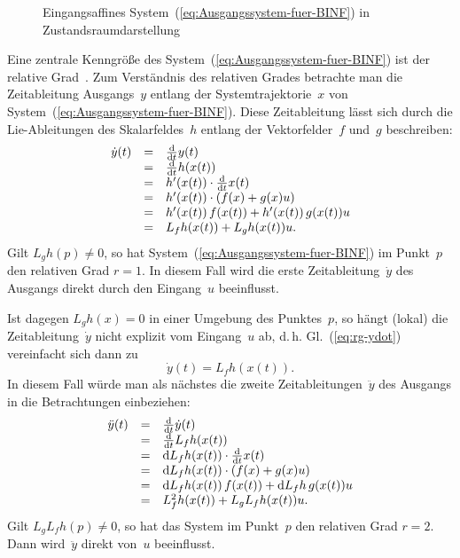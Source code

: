 \begin{figure}
\begin{centering}
\resizebox{0.8\textwidth}{!}{}
\par\end{centering}
\caption{Eingangsaffines System~(\ref{eq:Ausgangssystem-fuer-BINF}) in Zustandsraumdarstellung\label{fig:Ausgangssystem-fuer-BINF}}
\end{figure}

Eine zentrale Kenngröße des System~(\ref{eq:Ausgangssystem-fuer-BINF})
ist der relative Grad~\cite{isidori3,nijmeijer90}. Zum Verständnis
des relativen Grades betrachte man die Zeitableitung Ausgangs~$y$
entlang der Systemtrajektorie~$x$ von System~(\ref{eq:Ausgangssystem-fuer-BINF}).
Diese Zeitableitung lässt sich durch die Lie-Ableitungen des Skalarfeldes~$h$
entlang der Vektorfelder~$f$ und~$g$ beschreiben: 
\begin{equation}
\begin{array}{ccl}
\dot{y}(t) & = & \tfrac{{\mathrm{d}}}{{\mathrm{d}} t}y(t)\\
 & = & \tfrac{{\mathrm{d}}}{{\mathrm{d}} t}h(x(t))\\
 & = & h^{\prime}(x(t))\cdot\tfrac{{\mathrm{d}}}{{\mathrm{d}} t}x(t)\\
 & = & h^{\prime}(x(t))\cdot(f(x)+g(x)u)\\
 & = & h^{\prime}(x(t))\,f(x(t))+h^{\prime}(x(t))\,g(x(t))u\\
 & = & L_{f}h(x(t))+L_{g}h(x(t))u.
\end{array}\label{eq:rg-ydot}
\end{equation}
Gilt $L_{g}h(p)\neq0$, so hat System~(\ref{eq:Ausgangssystem-fuer-BINF})
im Punkt~$p$ den relativen Grad $r=1$. In diesem Fall wird die
erste Zeitableitung~$\dot{y}$ des Ausgangs direkt durch den Eingang~$u$
beeinflusst. 

Ist dagegen $L_{g}h(x)=0$ in einer Umgebung des Punktes~$p$, so
hängt (lokal) die Zeitableitung~$\dot{y}$ nicht explizit vom Eingang~$u$
ab, d.\,h. Gl.~(\ref{eq:rg-ydot}) vereinfacht sich dann zu 
\[
\dot{y}(t)=L_{f}h(x(t)).
\]
 In diesem Fall würde man als nächstes die zweite Zeitableitungen~$\ddot{y}$
des Ausgangs in die Betrachtungen einbeziehen: 
\begin{equation}
\begin{array}{ccl}
\ddot{y}(t) & = & \tfrac{{\mathrm{d}}}{{\mathrm{d}} t}\dot{y}(t)\\
 & = & \tfrac{{\mathrm{d}}}{{\mathrm{d}} t}L_{f}h(x(t))\\
 & = & {\mathrm{d}} L_{f}h(x(t))\cdot\tfrac{{\mathrm{d}}}{{\mathrm{d}} t}x(t)\\
 & = & {\mathrm{d}} L_{f}h(x(t))\cdot(f(x)+g(x)u)\\
 & = & {\mathrm{d}} L_{f}h(x(t))\,f(x(t))+{\mathrm{d}} L_{f}h\,g(x(t))u\\
 & = & L_{f}^{2}h(x(t))+L_{g}L_{f}h(x(t))u.
\end{array}\label{eq:rg-yddot}
\end{equation}
Gilt $L_{g}L_{f}h(p)\neq0$, so hat das System im Punkt~$p$ den
relativen Grad $r=2$. Dann wird~$\ddot{y}$ direkt von~$u$ beeinflusst. 

